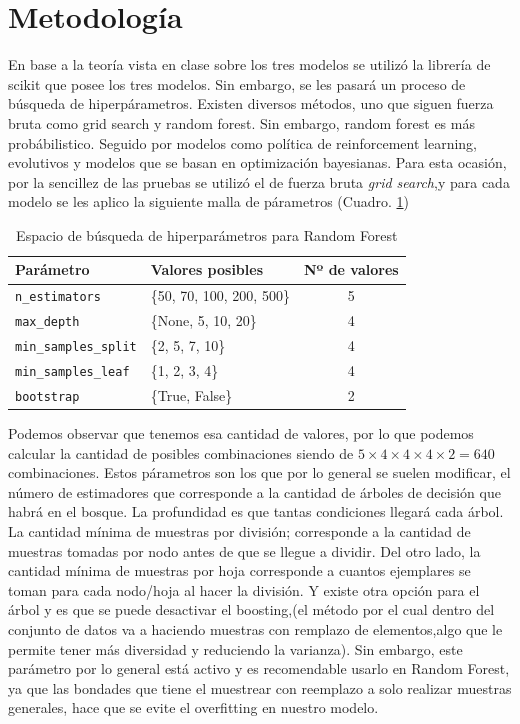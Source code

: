 \documentclass[conference]{IEEEtran}
\begin{document}
\section{Metodología}
En base a la teoría vista en clase sobre los tres modelos se utilizó la librería de scikit que posee los tres modelos. Sin embargo, se les pasará un proceso de búsqueda de hiperpárametros. Existen diversos métodos, uno que siguen fuerza bruta como grid search y random forest. Sin embargo, random forest es más probábilistico. Seguido por modelos como política de reinforcement learning, evolutivos y modelos que se basan en optimización bayesianas. Para esta ocasión, por la sencillez de las pruebas se utilizó el de fuerza bruta \textit{grid search},y para cada modelo se les aplico la siguiente malla de párametros (Cuadro. \ref{tab:Tabla_1})
\begin{table}[ht]
    \centering
    \begin{tabular}{|l|l|c|}
    \hline
    \textbf{Parámetro} & \textbf{Valores posibles} & \textbf{Nº de valores} \\ \hline
    \texttt{n\_estimators} & \{50, 70, 100, 200, 500\} & 5 \\ \hline
    \texttt{max\_depth} & \{None, 5, 10, 20\} & 4 \\ \hline
    \texttt{min\_samples\_split} & \{2, 5, 7, 10\} & 4 \\ \hline
    \texttt{min\_samples\_leaf} & \{1, 2, 3, 4\} & 4 \\ \hline
    \texttt{bootstrap} & \{True, False\} & 2 \\ \hline
    \end{tabular}
    \caption{Espacio de búsqueda de hiperparámetros para Random Forest}
    \label{tab:Tabla_1}
\end{table}
Podemos observar que tenemos esa cantidad de valores, por lo que podemos calcular la cantidad de posibles combinaciones siendo de $5\times4\times 4 \times 4 \times2 =640$ combinaciones. 
Estos párametros son los que por lo general se suelen modificar, el número de estimadores que corresponde a la cantidad de árboles de decisión que habrá en el bosque. La profundidad es que tantas condiciones llegará cada árbol. La cantidad mínima de muestras por división; corresponde a la cantidad de muestras tomadas por nodo antes de que se llegue a dividir. Del otro lado, la cantidad mínima de muestras por hoja corresponde a cuantos ejemplares se toman para cada nodo/hoja al hacer la división. Y existe otra opción para el árbol y es que se puede desactivar el boosting,(el método por el cual dentro del conjunto de datos va a haciendo muestras con remplazo de elementos,algo que le permite tener más diversidad y reduciendo la varianza). Sin embargo, este parámetro por lo general está activo y es recomendable usarlo en Random Forest, ya que las bondades que tiene el muestrear con reemplazo a solo realizar muestras generales, hace que se evite el overfitting en nuestro modelo.
\end{document}
